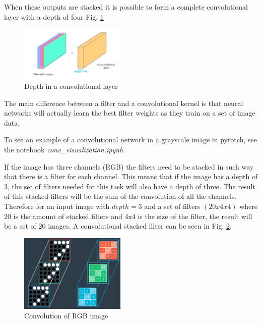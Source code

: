 \documentclass{article}
\begin{document}
When these outputs are stacked it is possible to form a complete convolutional layer with a depth of four Fig. \ref{fig:f17}

\begin{figure}[ht]
    \centering
    \includegraphics[width=0.45\textwidth,height=0.45\textheight,keepaspectratio]{images/depth.png}
    \captionsetup{justification=centering}
    \caption{Depth in a convolutional layer}
    \label{fig:f17}
\end{figure}

The main difference between a filter and a convolutional kernel is that neural networks will actually learn the best filter weights as they train on a set of image data. 

To see an example of a convolutional network in a grayscale image in pytorch, see the notebook \textit{conv\_visualization.ipynb}.

If the image has three channels (RGB) the filters need to be stacked in such way that there is a filter for each channel. This means that if the image has a depth of 3, the set of filters needed for this task will also have a depth of three. The result of this stacked filters will be the sum of the convolution of all the channels. Therefore for an input image with \(depth = 3\) and a set of filters \((20x4x4)\) where 20 is the amount of stacked filters and 4x4 is the size of the filter, the result will be a set of 20 images. A convolutional stacked filter can be seen in Fig. \ref{fig:f18}.

\begin{figure}[ht]
    \centering
    \includegraphics[width=0.45\textwidth,height=0.45\textheight,keepaspectratio]{images/conv_2d.png}
    \captionsetup{justification=centering}
    \caption{Convolution of RGB image}
    \label{fig:f18}
\end{figure}
\end{document}
